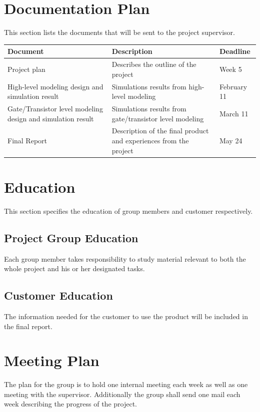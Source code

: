 \documentclass[a4paper,12pt]{article} \usepackage{graphicx}
\begin{document}
\section{Documentation Plan}
This section lists the documents that will be sent to the project supervisor.

\begin{longtable}{|p{40mm}|p{80mm}|p{30mm}|}
        \hline
        \textbf{Document} & \textbf{Description} & \textbf{Deadline} \\
        \hline
        Project plan & Describes the outline of the project & Week 5 \\
        \hline
        High-level modeling design and simulation result & Simulations results from high-level modeling & February 11 \\
        \hline
        Gate/Transistor level modeling design and simulation result  & Simulations results from gate/transistor level modeling & March 11 \\
        \hline
        Final Report & Description of the final product and experiences from the project & May 24 \\
        \hline
\end{longtable}


\section{Education}
This section specifies the education of group members and customer respectively.
\subsection{Project Group Education}
Each group member takes responsibility to study material relevant to both the
whole project and his or her designated tasks. 

\subsection{Customer Education}
The information needed for the customer to use the product will be included in
the final report.

\section{Meeting Plan}
The plan for the group is to hold one internal meeting each week as well as one meeting with the supervisor.
Additionally the group shall send one mail each week describing the progress of the project.
\end{document}

